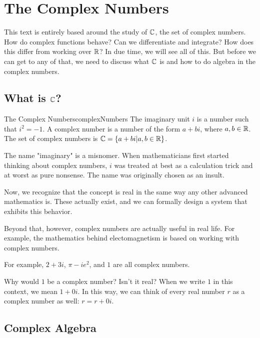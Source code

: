 \chapter{The Complex Numbers}

This text is entirely based around the study of $\mathbb{C}$, the set of complex numbers. How do complex functions behave? Can we differentiate and integrate? How does this differ from working over $\mathbb{R}$? In due time, we will see all of this. But before we can get to any of that, we need to discuss what $\mathbb{C}$ is and how to do algebra in the complex numbers.

\section{What is $\mathbb{C}$?}

\begin{defbo}{The Complex Numbers}{complexNumbers}
The imaginary unit $i$ is a number such that $i^2 = -1$. A complex number is a number of the form $a + bi$, where $a,b\in \mathbb{R}$. The set of complex numbers is $\mathbb{C} = \{a + bi| a,b\in \mathbb{R}\}$.
\end{defbo}

\begin{note}The name "imaginary" is a misnomer. When mathematicians first started thinking about complex numbers, $i$ was treated at best as a calculation trick and at worst as pure nonsense. The name was originally chosen as an insult.

Now, we recognize that the concept is real in the same way any other advanced mathematics is. These actually exist, and we can formally design a system that exhibits this behavior.

Beyond that, however, complex numbers are actually useful in real life. For example, the mathematics behind electomagnetism is based on working with complex numbers.\end{note}

\begin{ex}{}{} For example, $2 + 3i$, $\pi - ie^2$, and $1$ are all complex numbers.

Why would $1$ be a complex number? Isn't it real? When we write $1$ in this context, we mean $1 + 0i$. In this way, we can think of every real number $r$ as a complex number as well: $r = r + 0i$.
\end{ex}

\section{Complex Algebra}

